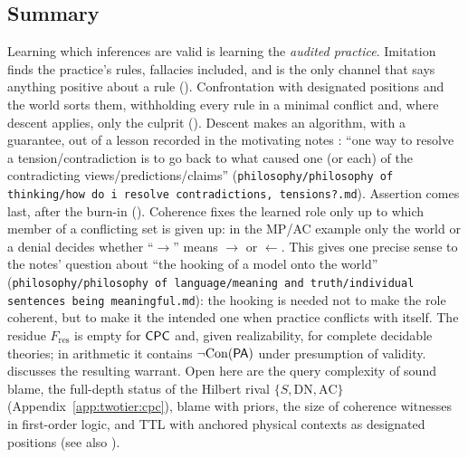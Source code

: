 \subsection{Summary}\label{sec:twotier:reading}

Learning which inferences are valid is learning the \emph{audited practice}. Imitation finds the practice's rules, fallacies included, and is the only channel that says anything positive about a rule (). Confrontation with designated positions and the world sorts them, withholding every rule in a minimal conflict and, where descent applies, only the culprit (). Descent makes an algorithm, with a guarantee, out of a lesson recorded in the motivating notes \citep{hanni2026notes}: ``one way to resolve a tension/contradiction is to go back to what caused one (or each) of the contradicting views/predictions/claims'' (\texttt{philosophy/\allowbreak philosophy of thinking/\allowbreak how do i resolve contradictions, tensions?.md}). Assertion comes last, after the burn-in (). Coherence fixes the learned role only up to which member of a conflicting set is given up: in the MP/AC example only the world or a denial decides whether ``$\to$'' means $\to$ or $\leftarrow$. This gives one precise sense to the notes' question about ``the hooking of a model onto the world'' (\texttt{philosophy/\allowbreak philosophy of language/\allowbreak meaning and truth/\allowbreak individual sentences being meaningful.md}): the hooking is needed not to make the role coherent, but to make it the intended one when practice conflicts with itself. The residue $F_{\mathrm{res}}$ is empty for $\mathsf{CPC}$ and, given realizability, for complete decidable theories; in arithmetic it contains $\neg\mathrm{Con}(\mathsf{PA})$ under presumption of validity.  discusses the resulting warrant. Open here are the query complexity of sound blame, the full-depth status of the Hilbert rival $\{S,\mathrm{DN},\mathrm{AC}\}$ (Appendix~\ref{app:twotier:cpc}), blame with priors, the size of coherence witnesses in first-order logic, and TTL with anchored physical contexts as designated positions (see also ).
